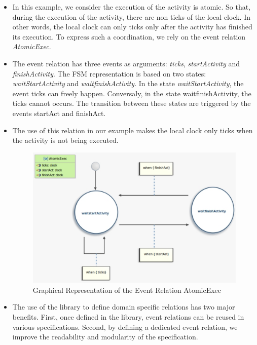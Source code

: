\begin{itemize}
		\item In this example, we consider the execution of the activity is atomic. So that, during the execution of the activity, there are non ticks of the local clock. In other words, the local clock can only ticks only after the activity has finished its execution. To express such a coordination, we rely on the event relation \emph{AtomicExec}.  
		
		\item The event relation has three events as arguments: \emph{ticks}, \emph{startActivity} and \emph{finishActivity}. The FSM representation is based on two states: \emph{waitStartActivity} and \emph{waitfinishActivity}. In the state \emph{waitStartActivity}, the event ticks can freely happen. Conversaly, in the state waitfinishActivity, the ticks cannot occurs. The transition between these states are triggered by the events startAct and finishAct.  
		
		\item The use of this relation in our example makes the local clock only ticks when the activity is not being executed. 
		
		\begin{figure}
		  \center
		  \includegraphics[scale=0.5]{examples/figs/AtomicExec.pdf}
		  \caption{Graphical Representation of the Event Relation AtomicExec}
		  \label{fig:LoopFromStartToFinishNonPreemptive}
		\end{figure}
					
		\item The use of the library to define domain specific relations has two major benefits. First, once defined in the library, event relations can be reused in various \bcool specifications. Second, by defining a dedicated event relation, we improve the readability and modularity of the \bcool specification.
	
	\end{itemize}

